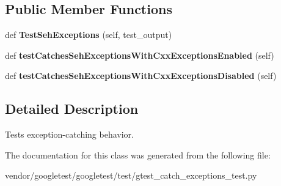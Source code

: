 \subsection*{Public Member Functions}
\begin{DoxyCompactItemize}
\item 
def {\bfseries Test\+Seh\+Exceptions} (self, test\+\_\+output)\hypertarget{classgtest__catch__exceptions__test_1_1CatchSehExceptionsTest_a737bbcc64405854aa8e0aea87ca5850b}{}\label{classgtest__catch__exceptions__test_1_1CatchSehExceptionsTest_a737bbcc64405854aa8e0aea87ca5850b}

\item 
def {\bfseries test\+Catches\+Seh\+Exceptions\+With\+Cxx\+Exceptions\+Enabled} (self)\hypertarget{classgtest__catch__exceptions__test_1_1CatchSehExceptionsTest_a02d06790fb52416a9da6a28b624e9cd9}{}\label{classgtest__catch__exceptions__test_1_1CatchSehExceptionsTest_a02d06790fb52416a9da6a28b624e9cd9}

\item 
def {\bfseries test\+Catches\+Seh\+Exceptions\+With\+Cxx\+Exceptions\+Disabled} (self)\hypertarget{classgtest__catch__exceptions__test_1_1CatchSehExceptionsTest_a4a181de9de2b147eff55ed7a1d7d40c4}{}\label{classgtest__catch__exceptions__test_1_1CatchSehExceptionsTest_a4a181de9de2b147eff55ed7a1d7d40c4}

\end{DoxyCompactItemize}


\subsection{Detailed Description}
\begin{DoxyVerb}Tests exception-catching behavior.\end{DoxyVerb}
 

The documentation for this class was generated from the following file\+:\begin{DoxyCompactItemize}
\item 
vendor/googletest/googletest/test/gtest\+\_\+catch\+\_\+exceptions\+\_\+test.\+py\end{DoxyCompactItemize}
